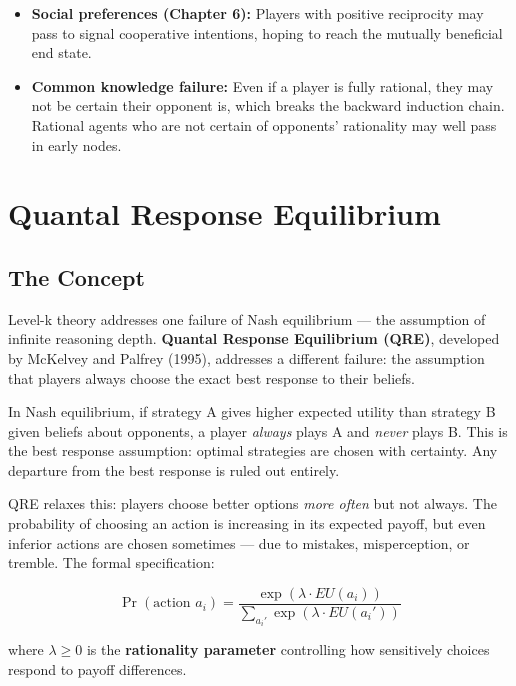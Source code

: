\documentclass[12pt, letterpaper]{article}
\begin{document}
\begin{itemize}
\item \textbf{Social preferences (Chapter 6):} Players with positive reciprocity may pass to signal cooperative intentions, hoping to reach the mutually beneficial end state.
\end{itemize}

\begin{itemize}
\item \textbf{Common knowledge failure:} Even if a player is fully rational, they may not be certain their opponent is, which breaks the backward induction chain. Rational agents who are not certain of opponents' rationality may well pass in early nodes.
\end{itemize}

\medskip


\section{Quantal Response Equilibrium}



\subsection{The Concept}


Level-k theory addresses one failure of Nash equilibrium --- the assumption of infinite reasoning depth. \textbf{Quantal Response Equilibrium (QRE)}, developed by McKelvey and Palfrey (1995), addresses a different failure: the assumption that players always choose the exact best response to their beliefs.

In Nash equilibrium, if strategy A gives higher expected utility than strategy B given beliefs about opponents, a player \textit{always} plays A and \textit{never} plays B. This is the best response assumption: optimal strategies are chosen with certainty. Any departure from the best response is ruled out entirely.

QRE relaxes this: players choose better options \textit{more often} but not always. The probability of choosing an action is increasing in its expected payoff, but even inferior actions are chosen sometimes --- due to mistakes, misperception, or tremble. The formal specification:

$$\Pr(\text{action } a_i) = \frac{\exp(\lambda \cdot EU(a_i))}{\sum_{a_i'} \exp(\lambda \cdot EU(a_i'))}$$

where $\lambda \geq 0$ is the \textbf{rationality parameter} controlling how sensitively choices respond to payoff differences.
\end{document}
